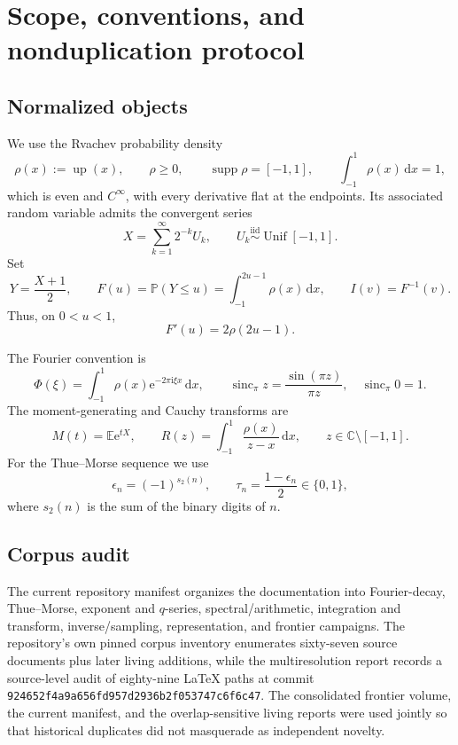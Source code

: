 \documentclass[11pt,oneside]{article}
\theoremstyle{definition}
\newcommand{\Up}{\operatorname{up}}
\newcommand{\sincpi}{\operatorname{sinc}_{\!\pi}}
\newcommand{\dd}{\,\mathrm d}
\newcommand{\ee}{\mathrm e}
\newcommand{\ii}{\mathrm i}
\newcommand{\E}{\mathbb E}
\newcommand{\Pp}{\mathbb P}
\begin{document}
\tableofcontents
\clearpage

\section{Scope, conventions, and nonduplication protocol}
\label{sec:scope}

\subsection{Normalized objects}

We use the Rvachev probability density
\[
 \rho(x):=\Up(x),\qquad \rho\ge0,\qquad
 \operatorname{supp}\rho=[-1,1],\qquad
 \int_{-1}^{1}\rho(x)\dd x=1,
\]
which is even and \(C^\infty\), with every derivative flat at the endpoints. Its associated
random variable admits the convergent series
\begin{equation}
 X=\sum_{k=1}^{\infty}2^{-k}U_k,
 \qquad U_k\stackrel{\mathrm{iid}}{\sim}\operatorname{Unif}[-1,1].
 \label{eq:X-random-series}
\end{equation}
Set
\[
 Y=\frac{X+1}{2},\qquad
 F(u)=\Pp(Y\le u)=\int_{-1}^{2u-1}\rho(x)\dd x,
 \qquad I(v)=F^{-1}(v).
\]
Thus, on \(0<u<1\),
\begin{equation}
 F'(u)=2\rho(2u-1).
 \label{eq:Fprime-rho}
\end{equation}

The Fourier convention is
\begin{equation}
 \Phi(\xi)=\int_{-1}^{1}\rho(x)\ee^{-2\pi\ii\xi x}\dd x,
 \qquad
 \sincpi z=\frac{\sin(\pi z)}{\pi z},\quad \sincpi 0=1.
 \label{eq:fourier-convention}
\end{equation}
The moment-generating and Cauchy transforms are
\begin{equation}
 M(t)=\E\ee^{tX},
 \qquad
 R(z)=\int_{-1}^{1}\frac{\rho(x)}{z-x}\dd x,
 \qquad z\in\mathbb C\setminus[-1,1].
 \label{eq:M-R-defs}
\end{equation}
For the Thue--Morse sequence we use
\begin{equation}
 \epsilon_n=(-1)^{s_2(n)},\qquad
 \tau_n=\frac{1-\epsilon_n}{2}\in\{0,1\},
 \label{eq:TM-conventions}
\end{equation}
where \(s_2(n)\) is the sum of the binary digits of \(n\).

\subsection{Corpus audit}

The current repository manifest organizes the documentation into Fourier-decay,
Thue--Morse, exponent and \(q\)-series, spectral/arithmetic, integration and transform,
inverse/sampling, representation, and frontier campaigns. The repository's own pinned
corpus inventory enumerates sixty-seven source documents plus later living additions, while
the multiresolution report records a source-level audit of eighty-nine \LaTeX{} paths at
commit \texttt{924652f4a9a656fd957d2936b2f053747c6f6c47}. The consolidated frontier volume,
the current manifest, and the overlap-sensitive living reports were used jointly so that
historical duplicates did not masquerade as independent novelty.
\end{document}
